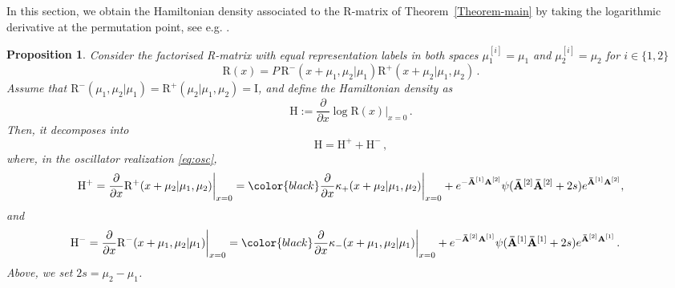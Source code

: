 \documentclass[11pt]{article}
\numberwithin{equation}{section}
\newtheorem{proposition}[theorem]{Proposition}
\newcommand{\OA}{\mathbf{A}}
\newcommand{\OAD}{\mathbf{\bar{A}}}
\newcommand{\ID}{\mathrm{I}}
\newcommand{\abrOSCR}{\mathrm{R}}
\newcommand{\abrOSCH}{\mathrm{H}}
\begin{document}
In this section, we obtain the Hamiltonian density associated to the R-matrix of Theorem~\eqref{Theorem-main} by taking the logarithmic derivative at the permutation point, see e.g. \cite{Faddeev:1996iy}. 




\begin{proposition}\label{proposition-Hdensity}
Consider the factorised R-matrix with equal representation labels in both spaces $\mu_1^{[i]}=\mu_{1}$ and $\mu_{2}^{[i]}=\mu_2$ for $i\in\{1,2\}$ 
 \begin{equation}
 \abrOSCR(x)=P\,\abrOSCR^-(x+\mu_1,\mu_2|\mu_1)\abrOSCR^+(x+\mu_2|\mu_1,\mu_2)\,.
 \end{equation}
 Assume that  $\abrOSCR^-(\mu_1,\mu_2|\mu_1)=\abrOSCR^+(\mu_2|\mu_1,\mu_2)=\ID$,
  and define the Hamiltonian density as
 \begin{equation}
  \abrOSCH:=\frac{\partial}{\partial x}\log \abrOSCR(x)\bigg|_{x=0}\,.
 \end{equation}
 Then, it decomposes into 
 \begin{equation}
     \abrOSCH=\abrOSCH^++\abrOSCH^-\,,
 \end{equation}
where, in the oscillator realization \eqref{eq:osc}, 
\begin{equation}\label{Hp-from-Rp}
\begin{split}
			\abrOSCH^+=&\left.                     \frac{\partial}{\partial x}\abrOSCR^+(x+\mu_2|\mu_1,\mu_2)\right|_{x=0}
            = {\color{black}\frac{\partial}{\partial x} \kappa_{+}(x+\mu_2|\mu_1,\mu_2)\bigg|_{x=0}
                                  +e^{-\OAD^{[1]}\OA^{[2]}}\psi(\OAD^{[2]}\OAD^{[2]}+2s)e^{\OAD^{[1]}\OA^{[2]}},}\\
                                        \end{split}
		\end{equation}
        and
        \begin{equation}\label{Hm-from-Rm}
            \begin{split}
                \abrOSCH^- =&                \left.\frac{\partial}{\partial x}\abrOSCR^-(x+\mu_1,\mu_2|\mu_1)\right|_{x=0}
                =
                                {\color{black}\frac{\partial}{\partial x}\kappa_{-}(x+\mu_1,\mu_2|\mu_1)\bigg|_{x=0}
                                +e^{-\OAD^{[2]}\OA^{[1]}}\psi(\OAD^{[1]}\OAD^{[1]}+2s)e^{\OAD^{[2]}\OA^{[1]}}}\,.
            \end{split}
        \end{equation}
        Above, we set $2s=\mu_2-\mu_1$.
\end{proposition}
\end{document}
